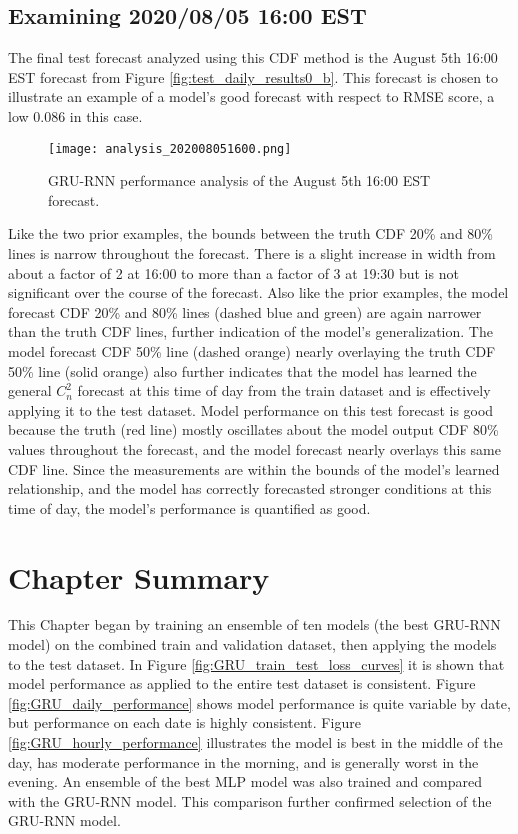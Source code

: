 \subsection{Examining 2020/08/05 16:00 EST}
The final test forecast analyzed using this CDF method is the August 5th 16:00 EST forecast from Figure \ref{fig:test_daily_results0_b}. This forecast is chosen to illustrate an example of a model's good forecast with respect to RMSE score, a low 0.086 in this case.
\begin{figure}[h!]
	\centering
	\texttt{[image: analysis\_202008051600.png]}
	\caption{GRU-RNN performance analysis of the August 5th 16:00 EST forecast.}
	\label{fig:analysis_08051600}
\end{figure}
Like the two prior examples, the bounds between the truth CDF 20\% and 80\% lines is narrow throughout the forecast. There is a slight increase in width from about a factor of 2 at 16:00 to more than a factor of 3 at 19:30 but is not significant over the course of the forecast. Also like the prior examples, the model forecast CDF 20\% and 80\% lines (dashed blue and green) are again narrower than the truth CDF lines, further indication of the model's generalization. The model forecast CDF 50\% line (dashed orange) nearly overlaying the truth CDF 50\% line (solid orange) also further indicates that the model has learned the general $C_{n}^{2}$ forecast at this time of day from the train dataset and is effectively applying it to the test dataset. Model performance on this test forecast is good because the truth (red line) mostly oscillates about the model output CDF 80\% values throughout the forecast, and the model forecast nearly overlays this same CDF line. Since the measurements are within the bounds of the model's learned relationship, and the model has correctly forecasted stronger conditions at this time of day, the model's performance is quantified as good.

\section{Chapter Summary}
This Chapter began by training an ensemble of ten models (the best \ac{GRU-RNN} model) on the combined train and validation dataset, then applying the models to the test dataset. In Figure \ref{fig:GRU_train_test_loss_curves} it is shown that model performance as applied to the entire test dataset is consistent. Figure \ref{fig:GRU_daily_performance} shows model performance is quite variable by date, but performance on each date is highly consistent. Figure \ref{fig:GRU_hourly_performance} illustrates the model is best in the middle of the day, has moderate performance in the morning, and is generally worst in the evening. An ensemble of the best \ac{MLP} model was also trained and compared with the \ac{GRU-RNN} model. This comparison further confirmed selection of the \ac{GRU-RNN} model.

